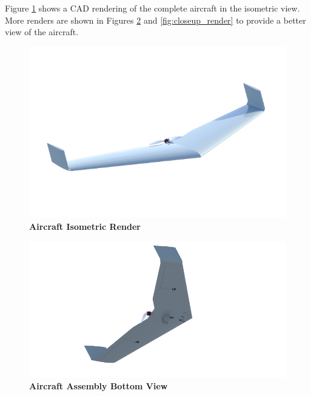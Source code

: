         Figure \ref{fig:iso_render} shows a CAD rendering of the complete aircraft in the isometric view. More renders are shown in Figures \ref{fig:bottom_render} and \ref{fig:closeup_render} to provide a better view of the aircraft.
          
        \begin{figure}[H]
            \centering
            \includegraphics[width=1.1\textwidth]{homeworks/homework4/report/Figure/aircraft_assembly_front_iso.png}
            \caption{\textbf{Aircraft Isometric Render}}
            \label{fig:iso_render}
        \end{figure}
        
        \begin{figure}[H]
            \centering
            \includegraphics[width=1.1\textwidth]{homeworks/homework4/report/Figure/aircraft_assembly_2.png}
            \caption{\textbf{Aircraft Assembly Bottom View}}
            \label{fig:bottom_render}
        \end{figure}
        
